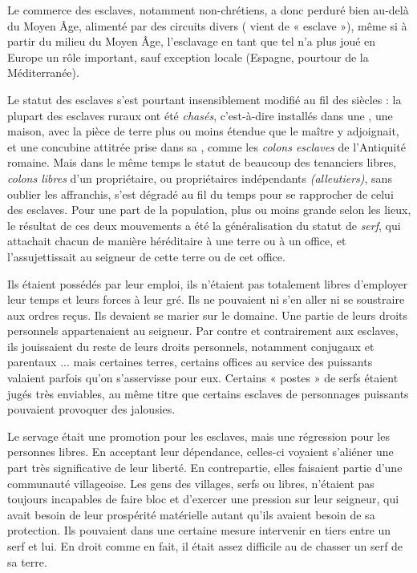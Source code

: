  Le commerce des esclaves, notamment non-chrétiens, a donc perduré bien au-delà du Moyen Âge, alimenté par des circuits divers ( vient de « esclave »), même si à partir du milieu du Moyen Âge, l'esclavage en tant que tel n'a plus joué en Europe un rôle important, sauf exception locale (Espagne, pourtour de la Méditerranée). 

 Le statut des esclaves s'est pourtant insensiblement modifié au fil des siècles : la plupart des esclaves ruraux ont été \emph{chasés}, c'est-à-dire installés dans une , une maison, avec la pièce de terre plus ou moins étendue que le maître y adjoignait, et une concubine attitrée prise dans sa , comme les \emph{colons esclaves} de l'Antiquité romaine. Mais dans le même temps le statut de beaucoup des tenanciers libres, \emph{colons libres} d'un propriétaire, ou propriétaires indépendants \emph{(alleutiers)}, sans oublier les affranchis, s'est dégradé au fil du temps pour se rapprocher de celui des esclaves. Pour une part de la population, plus ou moins grande selon les lieux, le résultat de ces deux mouvements a été la généralisation du statut de \emph{serf}, qui attachait chacun de manière héréditaire à une terre ou à un office, et l'assujettissait au seigneur  de cette terre ou de cet office. 

 Ils étaient possédés par leur emploi, ils n'étaient pas totalement libres d'employer leur temps et leurs forces à leur gré. Ils ne pouvaient ni s'en aller ni se soustraire aux ordres reçus. Ils devaient se marier sur le domaine. Une partie de leurs droits personnels appartenaient au seigneur. Par contre et contrairement aux esclaves, ils jouissaient du reste de leurs droits personnels, notamment conjugaux et parentaux ... mais certaines terres, certains offices au service des puissants valaient parfois qu'on s'asservisse pour eux. Certains « postes » de serfs étaient jugés très enviables, au même titre que certains esclaves de personnages puissants pouvaient provoquer des jalousies.

 Le servage était une promotion pour les esclaves, mais une régression pour les personnes libres. En acceptant leur dépendance, celles-ci voyaient s'aliéner une part très significative de leur liberté. En contrepartie, elles faisaient partie d'une communauté villageoise. Les gens des villages, serfs ou libres, n'étaient pas toujours incapables de faire bloc et d'exercer une pression sur leur seigneur, qui avait besoin de leur prospérité matérielle autant qu'ils avaient besoin de sa protection. Ils pouvaient dans une certaine mesure intervenir en tiers entre un serf et lui. En droit comme en fait, il était assez difficile au  de chasser un serf de sa terre. 
 
